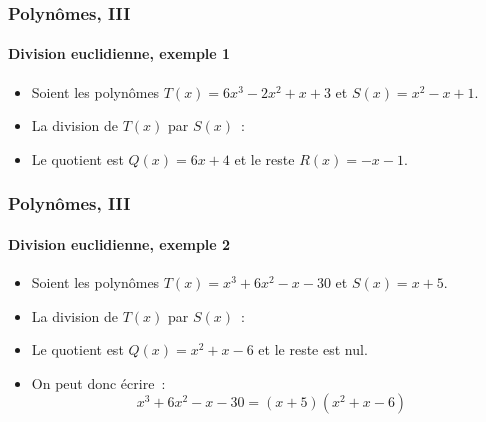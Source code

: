 \documentclass[10pt,notheorems]{beamer}
\theoremstyle{plain}
\theoremstyle{definition} %
\begin{document}
\begin{frame}
  \frametitle{Polynômes, III}
  \framesubtitle{Division euclidienne, exemple 1}
  \hypertarget{slide_division_exemple_1}{}

  \begin{itemize}

  \item Soient les polynômes $T(x) = 6x^3-2x^2+x+3$ et $S(x) = x^2-x+1$.\newline

  \item La division de $T(x)$ par $S(x)$~:\newline

    \begin{Center}
    \end{Center}

    \bigskip

  \item Le quotient est $Q(x) = 6x+4$ et le reste $R(x) = -x-1$.

  \end{itemize}

\end{frame}


\begin{frame}
  \frametitle{Polynômes, III}
  \framesubtitle{Division euclidienne, exemple 2}
  \hypertarget{slide_division_exemple_2}{}

  \bigskip

  \begin{itemize}

  \item Soient les polynômes $T(x) = x^3+6x^2-x-30$ et $S(x) = x+5$.\newline

  \item La division de $T(x)$ par $S(x)$~:\newline

    \begin{Center}
    \end{Center}

    \bigskip

  \item Le quotient est $Q(x) = x^2+x-6$ et le reste est nul.\newline

  \item On peut donc écrire~:
    \[
      x^3+6x^2-x-30 = (x+5)(x^2+x-6)
    \]

  \end{itemize}

\end{frame}
\end{document}
